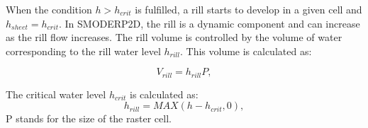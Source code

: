             When the condition $h>h_{crit}$ is fulfilled, a rill starts to develop in a
            given cell and $h_{sheet}=h_{crit}$. In SMODERP2D, the rill is a dynamic component and
            can increase as the rill flow increases. The rill volume is controlled by the
            volume of water corresponding to the rill water level $h_{rill}$. This volume is
            calculated as:


            \begin{equation}
              V_{rill} = h_{rill}P,
              \label{eq:rillvol}
            \end{equation}

            The critical water level $h_{crit}$ is calculated as:
            \begin{equation}
              h_{rill} = MAX(h-h_{crit},0),
              \label{eq:hrill}
            \end{equation}
            P stands for the size of the raster cell. 


